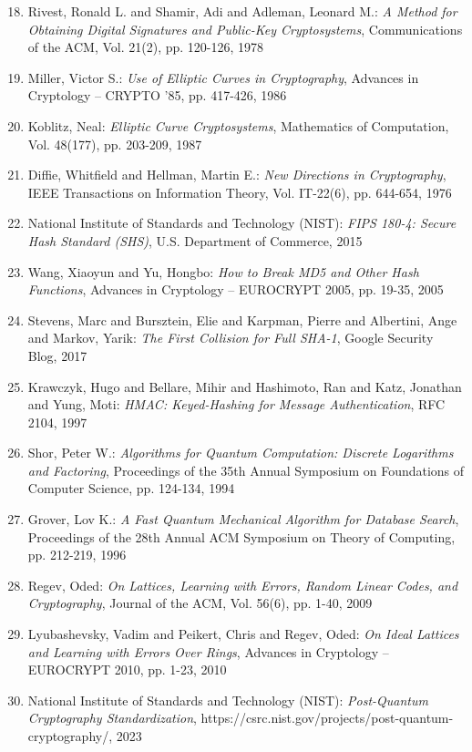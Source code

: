 ﻿\documentclass[12pt,a4paper]{article}
\begin{document}
	\begin{enumerate}
		\setcounter{enumi}{17}
		\item Rivest, Ronald L. and Shamir, Adi and Adleman, Leonard M.: \textit{A Method for Obtaining Digital Signatures and Public-Key Cryptosystems}, Communications of the ACM, Vol. 21(2), pp. 120-126, 1978
		\item Miller, Victor S.: \textit{Use of Elliptic Curves in Cryptography}, Advances in Cryptology -- CRYPTO '85, pp. 417-426, 1986
		\item Koblitz, Neal: \textit{Elliptic Curve Cryptosystems}, Mathematics of Computation, Vol. 48(177), pp. 203-209, 1987
		\item Diffie, Whitfield and Hellman, Martin E.: \textit{New Directions in Cryptography}, IEEE Transactions on Information Theory, Vol. IT-22(6), pp. 644-654, 1976
	\end{enumerate}
	
	\begin{enumerate}
		\setcounter{enumi}{21}
		\item National Institute of Standards and Technology (NIST): \textit{FIPS 180-4: Secure Hash Standard (SHS)}, U.S. Department of Commerce, 2015
		\item Wang, Xiaoyun and Yu, Hongbo: \textit{How to Break MD5 and Other Hash Functions}, Advances in Cryptology -- EUROCRYPT 2005, pp. 19-35, 2005
		\item Stevens, Marc and Bursztein, Elie and Karpman, Pierre and Albertini, Ange and Markov, Yarik: \textit{The First Collision for Full SHA-1}, Google Security Blog, 2017
		\item Krawczyk, Hugo and Bellare, Mihir and Hashimoto, Ran and Katz, Jonathan and Yung, Moti: \textit{HMAC: Keyed-Hashing for Message Authentication}, RFC 2104, 1997
	\end{enumerate}
	
	\begin{enumerate}
		\setcounter{enumi}{25}
		\item Shor, Peter W.: \textit{Algorithms for Quantum Computation: Discrete Logarithms and Factoring}, Proceedings of the 35th Annual Symposium on Foundations of Computer Science, pp. 124-134, 1994
		\item Grover, Lov K.: \textit{A Fast Quantum Mechanical Algorithm for Database Search}, Proceedings of the 28th Annual ACM Symposium on Theory of Computing, pp. 212-219, 1996
		\item Regev, Oded: \textit{On Lattices, Learning with Errors, Random Linear Codes, and Cryptography}, Journal of the ACM, Vol. 56(6), pp. 1-40, 2009
		\item Lyubashevsky, Vadim and Peikert, Chris and Regev, Oded: \textit{On Ideal Lattices and Learning with Errors Over Rings}, Advances in Cryptology -- EUROCRYPT 2010, pp. 1-23, 2010
		\item National Institute of Standards and Technology (NIST): \textit{Post-Quantum Cryptography Standardization}, https://csrc.nist.gov/projects/post-quantum-cryptography/, 2023
	\end{enumerate}
	
\end{document}
